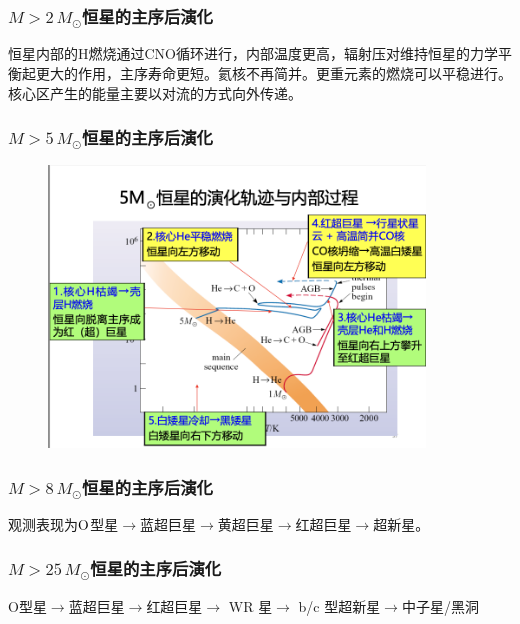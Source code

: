 \documentclass[../天体物理基础.tex]{subfiles}
\begin{document}
\subsubsection{\texorpdfstring{$M>2\,M_{\odot}$}{}恒星的主序后演化}

恒星内部的$\mathrm{H}$燃烧通过$\mathrm{CNO}$循环进行，内部温度更高，辐射压对维持恒星的力学平衡起更大的作用，主序寿命更短。氦核不再简并。更重元素的燃烧可以平稳进行。核心区产生的能量主要以对流的方式向外传递。

\subsubsection{\texorpdfstring{$M>5\,M_{\odot}$}{}恒星的主序后演化}

\begin{figure}[!htbp]
\centering
\includegraphics[width=10cm]{figures/figure2_6.png}
\captionsetup{justification=raggedright, singlelinecheck=false}
\caption{}
\label{}
\end{figure}

\subsubsection{\texorpdfstring{$M>8\,M_{\odot}$}{}恒星的主序后演化}

观测表现为$\rm O$型星$\to$蓝超巨星$\to$黄超巨星$\to$红超巨星$\to$超新星。

\subsubsection{\texorpdfstring{$M>25\,M_{\odot}$}{}恒星的主序后演化}

$\mathrm{O}$型星$\to$蓝超巨星$\to$红超巨星$\to$ WR 星$\to$ \uppercase\expandafter{}b/\uppercase\expandafter{}c 型超新星$\to$中子星/黑洞
\end{document}
